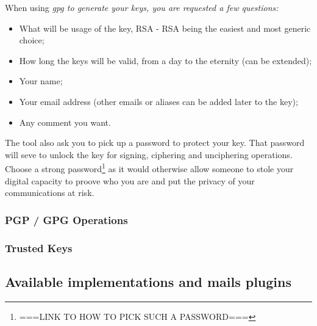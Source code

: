 When using \it{gpg} to generate your keys, you are requested a few questions:
\begin{itemize}
    \item What will be usage of the key, RSA - RSA being the easiest and most generic choice;
    \item How long the keys will be valid, from a day to the eternity  (can be extended);
    \item Your name;
    \item Your email address (other emails or aliases can be added later to the key);
    \item Any comment you want.
\end{itemize}

The tool also ask you to pick up a password to protect your key.  That password will seve to unlock the key for signing, ciphering and unciphering operations.  Choose a strong password\footnote{===LINK TO HOW TO PICK SUCH A PASSWORD===} as it would otherwise allow someone to stole your digital capacity to proove who you are and put the privacy of your communications at risk.

\subsubsection{PGP / GPG Operations}



\subsubsection{Trusted Keys}


\subsection{Available implementations and mails plugins}





